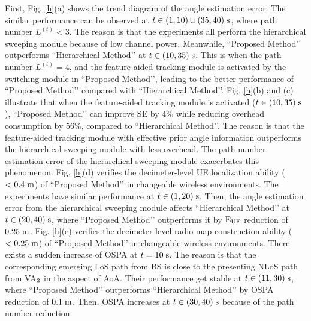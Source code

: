 \documentclass[journal,12pt,onecolumn,draftclsnofoot,]{IEEEtran}
\begin{document}
First, Fig. \ref{h}(a) shows the trend diagram of the angle estimation error. 
The similar performance can be observed at $t \in {(1,10) }\cup {(35,40)}{\;\rm s}$, where path number $L^{(t)}<3$. 
The reason is that the experiments all perform the hierarchical sweeping module because of low channel power.
Meanwhile, ``Proposed Method’’ outperforms ``Hierarchical Method’’ at $t \in {(10,35) }{\;\rm s}$. 
This is when the path number $L^{(t)}=4$, and the feature-aided tracking module is activated by the switching module in ``Proposed Method’’, leading to the better performance of ``Proposed Method’’ compared with ``Hierarchical Method’’.
{\color{black}Fig. \ref{h}(b) and (c) illustrate that when the feature-aided tracking module is activated ($t \in {(10,35) }{\;\rm s}$), ``Proposed Method’’ can improve SE by $4\%$ while reducing overhead consumption by $56\%$, compared to ``Hierarchical Method’’.} 
The reason is that the feature-aided tracking module with effective prior angle information outperforms the hierarchical sweeping module with less overhead. 
The path number estimation error of the hierarchical sweeping module exacerbates this phenomenon.
Fig. \ref{h}(d) verifies the decimeter-level UE localization ability ($<0.4\;{\rm m}$) of ``Proposed Method’’ in changeable wireless environments. 
The experiments have similar performance at $t \in {(1,20) }{\;\rm s}$. Then, the angle estimation error from the hierarchical sweeping module affects ``Hierarchical Method’’ at $t \in {(20,40) }{\;\rm s}$, where ``Proposed Method’’ outperforms it by ${{\rm{E}}_{{\rm{UE}}}}$ reduction of $0.25{\;\rm m}$.
Fig. \ref{h}(e) verifies the decimeter-level radio map construction ability ($<0.25\;{\rm m}$) of ``Proposed Method’’ in changeable wireless environments. 
There exists a sudden increase of OSPA at $t=10{\;\rm s}$. The reason is that the corresponding emerging LoS path from BS is close to the presenting NLoS path from VA${\rm _2}$ in the aspect of AoA. 
Their performance get stable at $t \in {(11,30) }{\;\rm s}$, where ``Proposed Method’’ outperforms ``Hierarchical Method’’ by OSPA reduction of $0.1{\;\rm m}$. Then, OSPA increases at $t \in {(30,40) }{\;\rm s}$ because of the path number reduction.
\end{document}
